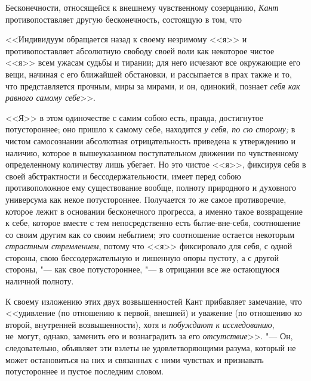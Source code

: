 Бесконечности, относящейся к внешнему чувственному созерцанию, {\em Кант}
противопоставляет другую бесконечность, состоящую в том, что

<<Индивидуум обращается назад к своему незримому <<я>> и противопоставляет
абсолютную свободу своей воли как некоторое чистое <<я>> всем ужасам судьбы
и тирании; для него исчезают все окружающие его вещи, начиная с его ближайшей
обстановки, и рассыпается в прах также и то, что представляется прочным, миры
за мирами, и он, одинокий, познает {\em себя как равного самому себе}>>.

<<Я>> в этом одиночестве с самим собою есть, правда, достигнутое потустороннее;
оно пришло к самому себе, находится {\em у себя, по сю сторону;} в чистом
самосознании абсолютная отрицательность приведена к утверждению и наличию,
которое в вышеуказанном поступательном движении по чувственному определенному
количеству лишь убегает. Но это чистое <<я>>, фиксируя себя в своей
абстрактности и бессодержательности, имеет перед собою противоположное ему
существование вообще, полноту природного и духовного универсума как некое
потустороннее. Получается то же самое противоречие, которое лежит в основании
бесконечного прогресса, а именно такое возвращение к себе, которое вместе с тем
непосредственно есть бытие-вне-себя, соотношение со своим другим как со своим
небытием; это соотношение остается некоторым {\em страстным стремлением},
потому что <<я>> фиксировало для себя, с одной стороны, свою бессодержательную
и лишенную опоры пустоту, а с другой стороны, "--- как свое потустороннее, "---
в отрицании все же остающуюся наличной полноту.

К своему изложению этих двух возвышенностей Кант прибавляет замечание, что
<<удивление (по отношению к первой, внешней) и уважение (по отношению ко
второй, внутренней возвышенности), хотя и {\em побуждают к исследованию},
не~могут, однако, заменить его и вознаградить за его
{\em отсутствие}>>. "--- Он, следовательно, объявляет эти взлеты не удовлетворяющими
разума, который не может остановиться на них и связанных с ними чувствах и
признавать потустороннее и пустое последним словом.

